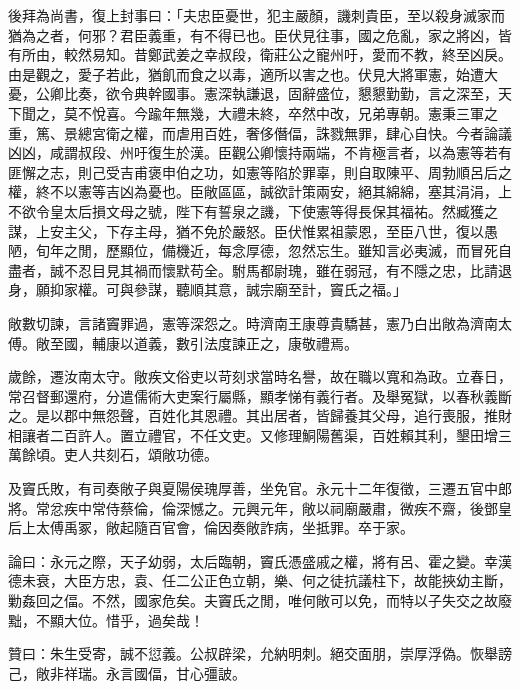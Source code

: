 \begin{pinyinscope}
後拜為尚書，復上封事曰：「夫忠臣憂世，犯主嚴顏，譏刺貴臣，至以殺身滅家而猶為之者，何邪？君臣義重，有不得已也。臣伏見往事，國之危亂，家之將凶，皆有所由，較然易知。昔鄭武姜之幸叔段，衛莊公之寵州吁，愛而不教，終至凶戾。由是觀之，愛子若此，猶飢而食之以毒，適所以害之也。伏見大將軍憲，始遭大憂，公卿比奏，欲令典幹國事。憲深執謙退，固辭盛位，懇懇勤勤，言之深至，天下聞之，莫不悅喜。今踰年無幾，大禮未終，卒然中改，兄弟專朝。憲秉三軍之重，篤、景總宮衛之權，而虐用百姓，奢侈僭偪，誅戮無罪，肆心自快。今者論議凶凶，咸謂叔段、州吁復生於漢。臣觀公卿懷持兩端，不肯極言者，以為憲等若有匪懈之志，則己受吉甫褒申伯之功，如憲等陷於罪辜，則自取陳平、周勃順呂后之權，終不以憲等吉凶為憂也。臣敞區區，誠欲計策兩安，絕其綿綿，塞其涓涓，上不欲令皇太后損文母之號，陛下有誓泉之譏，下使憲等得長保其福祐。然臧獲之謀，上安主父，下存主母，猶不免於嚴怒。臣伏惟累祖蒙恩，至臣八世，復以愚陋，旬年之閒，歷顯位，備機近，每念厚德，忽然忘生。雖知言必夷滅，而冒死自盡者，誠不忍目見其禍而懷默苟全。駙馬都尉瑰，雖在弱冠，有不隱之忠，比請退身，願抑家權。可與參謀，聽順其意，誠宗廟至計，竇氏之福。」

敞數切諫，言諸竇罪過，憲等深怨之。時濟南王康尊貴驕甚，憲乃白出敞為濟南太傅。敞至國，輔康以道義，數引法度諫正之，康敬禮焉。

歲餘，遷汝南太守。敞疾文俗吏以苛刻求當時名譽，故在職以寬和為政。立春日，常召督郵還府，分遣儒術大吏案行屬縣，顯孝悌有義行者。及舉冤獄，以春秋義斷之。是以郡中無怨聲，百姓化其恩禮。其出居者，皆歸養其父母，追行喪服，推財相讓者二百許人。置立禮官，不任文吏。又修理鮦陽舊渠，百姓賴其利，墾田增三萬餘頃。吏人共刻石，頌敞功德。

及竇氏敗，有司奏敞子與夏陽侯瑰厚善，坐免官。永元十二年復徵，三遷五官中郎將。常忿疾中常侍蔡倫，倫深憾之。元興元年，敞以祠廟嚴肅，微疾不齋，後鄧皇后上太傅禹冢，敞起隨百官會，倫因奏敞詐病，坐抵罪。卒于家。

論曰：永元之際，天子幼弱，太后臨朝，竇氏憑盛戚之權，將有呂、霍之變。幸漢德未衰，大臣方忠，袁、任二公正色立朝，樂、何之徒抗議柱下，故能挾幼主斷，勦姦回之偪。不然，國家危矣。夫竇氏之閒，唯何敞可以免，而特以子失交之故廢黜，不顯大位。惜乎，過矣哉！

贊曰：朱生受寄，誠不愆義。公叔辟梁，允納明刺。絕交面朋，崇厚浮偽。恢舉謗己，敞非祥瑞。永言國偪，甘心彊詖。


\end{pinyinscope}